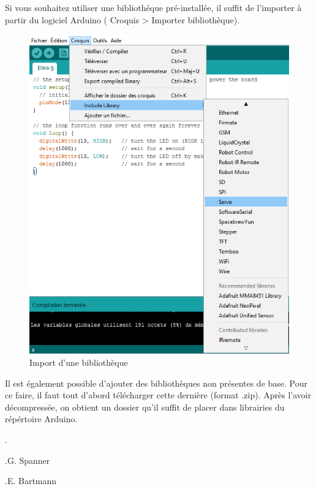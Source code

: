 \documentclass[12pt,a4paper]{article}
\begin{document}
\bigskip
Si vous souhaitez utiliser une bibliothéque pré-installée, il suffit de l'importer à partir du logiciel Arduino ( Croquis > Importer bibliothèque).

\begin{figure}[h!]
    \centering
    \includegraphics[scale=0.6]{rajouterlib.png}
    \caption{Import d'une bibliothèque}
    \label{fig:my_label}
\end{figure}

\bigskip
Il est également possible d’ajouter des bibliothèques non présentes de base. Pour ce faire, il faut tout d'abord télécharger cette dernière (format .zip). Après l'avoir décompressée, on obtient un dossier qu'il suffit de placer dans librairies du répértoire Arduino.

.


\bigskip
\begin{thebibliography}{99} %

.G. Spanner

 .E. Bartmann 
\end{thebibliography}

\end{document}
